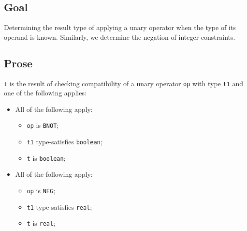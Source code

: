 \documentclass{book}
\begin{document}
\subsection{Goal}
  Determining the result type of applying a unary operator when the type of its operand is known.
  Similarly, we determine the negation of integer constraints.

\subsection{Prose}
  \texttt{t} is the result of checking compatibility of a unary operator \texttt{op} with
  type \texttt{t1} and one of the following applies:
  \begin{itemize}
  \item All of the following apply:
    \begin{itemize}
      \item \texttt{op} is \texttt{BNOT};
      \item \texttt{t1} type-satisfies \texttt{boolean};
      \item \texttt{t} is \texttt{boolean};
    \end{itemize}

  \item All of the following apply:
  \begin{itemize}
    \item \texttt{op} is \texttt{NEG};
    \item \texttt{t1} type-satisfies \texttt{real};
    \item \texttt{t} is \texttt{real};
  \end{itemize}


\end{itemize}
\end{document}
